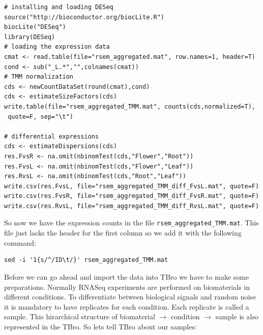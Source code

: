 \documentclass[english]{scrartcl}
\begin{document}
\begin{lstlisting}[style=R]
# installing and loading DESeq
source("http://bioconductor.org/biocLite.R")
biocLite("DESeq")
library(DESeq)
# loading the expression data
cmat <- read.table(file="rsem_aggregated.mat", row.names=1, header=T)
cond <- sub("_L.*","",colnames(cmat))
# TMM normalization
cds <- newCountDataSet(round(cmat),cond)
cds <- estimateSizeFactors(cds)
write.table(file="rsem_aggregated_TMM.mat", counts(cds,normalized=T),
 quote=F, sep="\t")

# differential expressions
cds <- estimateDispersions(cds)
res.FvsR <- na.omit(nbinomTest(cds,"Flower","Root"))
res.FvsL <- na.omit(nbinomTest(cds,"Flower","Leaf"))
res.RvsL <- na.omit(nbinomTest(cds,"Root","Leaf"))
write.csv(res.FvsL, file="rsem_aggregated_TMM_diff_FvsL.mat", quote=F) 
write.csv(res.FvsR, file="rsem_aggregated_TMM_diff_FvsR.mat", quote=F)
write.csv(res.RvsL, file="rsem_aggregated_TMM_diff_RvsL.mat", quote=F)
\end{lstlisting}

So now we have the expression counts in the file
\texttt{rsem\_aggregated\_TMM.mat}. This file just lacks the header for the
first column so we add it with the following command:
\begin{lstlisting}
sed -i '1{s/^/ID\t/}' rsem_aggregated_TMM.mat
\end{lstlisting}

Before we can go ahead and import the data into TBro we have to make some
preparations. Normally RNASeq experiments are performed on biomaterials in
different conditions. To differentiate between biological signals and random
noise it is mandatory to have replicates for each condition. Each replicate is
called a sample. This hirarchical structure of biomaterial $\rightarrow$
condition $\rightarrow$ sample is also represented in the TBro. So lets tell
TBro about our samples:
\end{document}
